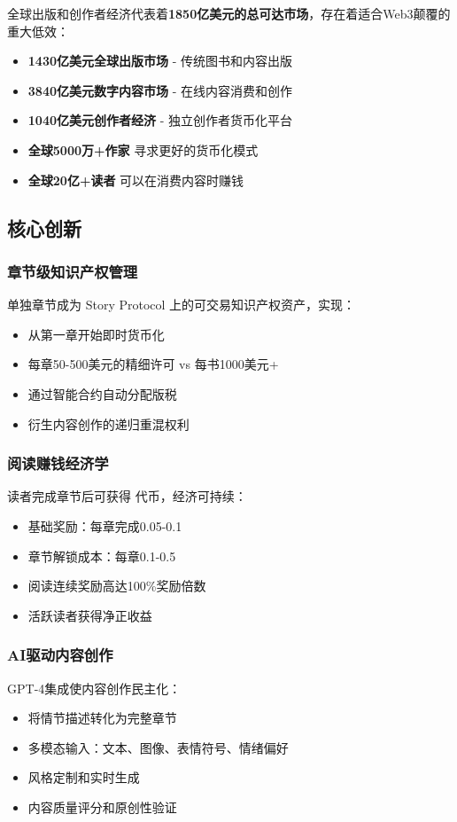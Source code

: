 全球出版和创作者经济代表着\textbf{1850亿美元的总可达市场}，存在着适合Web3颠覆的重大低效：

\begin{itemize}
    \item \textbf{1430亿美元全球出版市场} - 传统图书和内容出版
    \item \textbf{3840亿美元数字内容市场} - 在线内容消费和创作
    \item \textbf{1040亿美元创作者经济} - 独立创作者货币化平台
    \item \textbf{全球5000万+作家} 寻求更好的货币化模式
    \item \textbf{全球20亿+读者} 可以在消费内容时赚钱
\end{itemize}

\subsection{核心创新}

\subsubsection{章节级知识产权管理}
单独章节成为 Story Protocol 上的可交易知识产权资产，实现：
\begin{itemize}
    \item 从第一章开始即时货币化
    \item 每章50-500美元的精细许可 vs 每书1000美元+
    \item 通过智能合约自动分配版税
    \item 衍生内容创作的递归重混权利
\end{itemize}

\subsubsection{阅读赚钱经济学}
读者完成章节后可获得 \tip{} 代币，经济可持续：
\begin{itemize}
    \item 基础奖励：每章完成0.05-0.1 \tip{}
    \item 章节解锁成本：每章0.1-0.5 \tip{}
    \item 阅读连续奖励高达100\%奖励倍数
    \item 活跃读者获得净正收益
\end{itemize}

\subsubsection{AI驱动内容创作}
GPT-4集成使内容创作民主化：
\begin{itemize}
    \item 将情节描述转化为完整章节
    \item 多模态输入：文本、图像、表情符号、情绪偏好
    \item 风格定制和实时生成
    \item 内容质量评分和原创性验证
\end{itemize}

